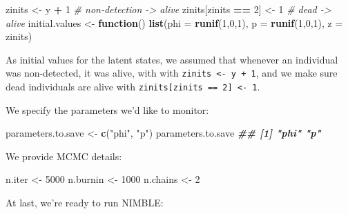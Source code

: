 \documentclass[
  12pt,
]{krantz}
\newenvironment{Shaded}{\begin{snugshade}}{\end{snugshade}}
\newcommand{\AttributeTok}[1]{\textcolor[rgb]{0.13,0.29,0.53}{#1}}
\newcommand{\CommentTok}[1]{\textcolor[rgb]{0.56,0.35,0.01}{\textit{#1}}}
\newcommand{\ControlFlowTok}[1]{\textcolor[rgb]{0.13,0.29,0.53}{\textbf{#1}}}
\newcommand{\DecValTok}[1]{\textcolor[rgb]{0.00,0.00,0.81}{#1}}
\newcommand{\DocumentationTok}[1]{\textcolor[rgb]{0.56,0.35,0.01}{\textbf{\textit{#1}}}}
\newcommand{\FunctionTok}[1]{\textcolor[rgb]{0.13,0.29,0.53}{\textbf{#1}}}
\newcommand{\NormalTok}[1]{#1}
\newcommand{\OtherTok}[1]{\textcolor[rgb]{0.56,0.35,0.01}{#1}}
\newcommand{\SpecialCharTok}[1]{\textcolor[rgb]{0.81,0.36,0.00}{\textbf{#1}}}
\newcommand{\StringTok}[1]{\textcolor[rgb]{0.31,0.60,0.02}{#1}}
\begin{document}
\begin{Shaded}
\begin{Highlighting}[]
\NormalTok{zinits }\OtherTok{\textless{}{-}}\NormalTok{ y }\SpecialCharTok{+} \DecValTok{1} \CommentTok{\# non{-}detection {-}\textgreater{} alive}
\NormalTok{zinits[zinits }\SpecialCharTok{==} \DecValTok{2}\NormalTok{] }\OtherTok{\textless{}{-}} \DecValTok{1} \CommentTok{\# dead {-}\textgreater{} alive}
\NormalTok{initial.values }\OtherTok{\textless{}{-}} \ControlFlowTok{function}\NormalTok{() }\FunctionTok{list}\NormalTok{(}\AttributeTok{phi =} \FunctionTok{runif}\NormalTok{(}\DecValTok{1}\NormalTok{,}\DecValTok{0}\NormalTok{,}\DecValTok{1}\NormalTok{),}
                                  \AttributeTok{p =} \FunctionTok{runif}\NormalTok{(}\DecValTok{1}\NormalTok{,}\DecValTok{0}\NormalTok{,}\DecValTok{1}\NormalTok{),}
                                  \AttributeTok{z =}\NormalTok{ zinits)}
\end{Highlighting}
\end{Shaded}

As initial values for the latent states, we assumed that whenever an individual was non-detected, it was alive, with with \texttt{zinits\ \textless{}-\ y\ +\ 1}, and we make sure dead individuals are alive with \texttt{zinits{[}zinits\ ==\ 2{]}\ \textless{}-\ 1}.

We specify the parameters we'd like to monitor:

\begin{Shaded}
\begin{Highlighting}[]
\NormalTok{parameters.to.save }\OtherTok{\textless{}{-}} \FunctionTok{c}\NormalTok{(}\StringTok{"phi"}\NormalTok{, }\StringTok{"p"}\NormalTok{)}
\NormalTok{parameters.to.save}
\DocumentationTok{\#\# [1] "phi" "p"}
\end{Highlighting}
\end{Shaded}

We provide MCMC details:

\begin{Shaded}
\begin{Highlighting}[]
\NormalTok{n.iter }\OtherTok{\textless{}{-}} \DecValTok{5000}
\NormalTok{n.burnin }\OtherTok{\textless{}{-}} \DecValTok{1000}
\NormalTok{n.chains }\OtherTok{\textless{}{-}} \DecValTok{2}
\end{Highlighting}
\end{Shaded}

At last, we're ready to run NIMBLE:
\end{document}
